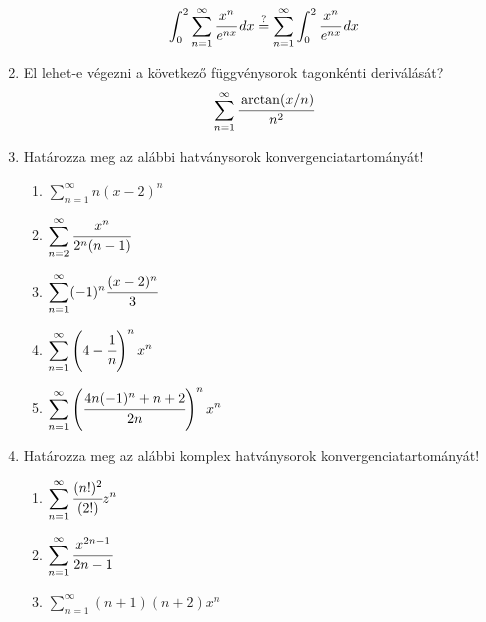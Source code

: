 \documentclass[a4paper, 12pt]{scrartcl}
\begin{document}
\begin{enumerate}
    \[
    \int_0^2 \sum_{n=1}^{\infty} \cfrac{x^n}{e^{nx}}\, dx \overset{?}{=} \sum_{n=1}^{\infty} \int_0^2 \cfrac{x^n}{e^{nx}}\, dx 
    \]
    \item El lehet-e végezni a következő függvénysorok tagonkénti deriválását?
    \[
    \sum_{n=1}^{\infty} \cfrac{\arctan(x/n)}{n^2}
    \]
    \item Határozza meg az alábbi hatványsorok konvergenciatartományát!
    \begin{multicols}{2}
        \begin{enumerate}
            \item $\displaystyle \sum_{n=1}^{\infty} n(x-2)^n$
            \item $\displaystyle \sum_{n=2}^{\infty} \cfrac{x^n}{2^n(n-1)}$
            \item $\displaystyle \sum_{n=1}^{\infty} (-1)^n\cfrac{(x-2)^n}{3}$
            \item $\displaystyle \sum_{n=1}^{\infty} \left(4-\cfrac{1}{n}\right)^n x^n$
            \item $\displaystyle \sum_{n=1}^{\infty} \left(\cfrac{4n(-1)^n+n+2}{2n}\right)^nx^n$
        \end{enumerate}
    \end{multicols}
    \item Határozza meg az alábbi komplex hatványsorok konvergenciatartományát!
    \begin{multicols}{3}
        \begin{enumerate}
            \item $\displaystyle \sum_{n=1}^{\infty} \cfrac{(n!)^2}{(2!)}z^n$
            \item $\displaystyle \sum_{n=1}^{\infty} \cfrac{x^{2n-1}}{2n-1}$
            \item $\displaystyle \sum_{n=1}^{\infty} (n+1)(n+2)x^n$
        \end{enumerate}
    \end{multicols}
\end{enumerate}
\end{document}
